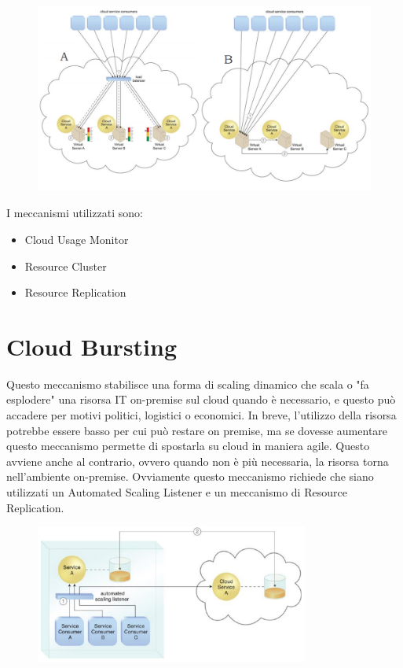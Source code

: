 \begin{figure}[htb!]
    \centering
    \includegraphics[width=13cm]{./Images/cap11/11.4.png}
\end{figure}

I meccanismi utilizzati sono:
\begin{itemize}
    \item Cloud Usage Monitor
    \item Resource Cluster
    \item Resource Replication
\end{itemize}

\section{Cloud Bursting}
Questo meccanismo stabilisce una forma di scaling dinamico che scala o "fa esplodere" una risorsa IT on-premise sul cloud quando è necessario, e questo può accadere per motivi politici, logistici o economici. In breve, l'utilizzo della risorsa potrebbe essere basso per cui può restare on premise, ma se dovesse aumentare questo meccanismo permette di spostarla su cloud in maniera agile. Questo avviene anche al contrario, ovvero quando non è più necessaria, la risorsa torna nell'ambiente on-premise. Ovviamente questo meccanismo richiede che siano utilizzati un Automated Scaling Listener e un meccanismo di Resource Replication.

\begin{figure}[htb!]
    \centering
    \includegraphics[width=9cm]{./Images/cap11/11.5.png}
\end{figure}

